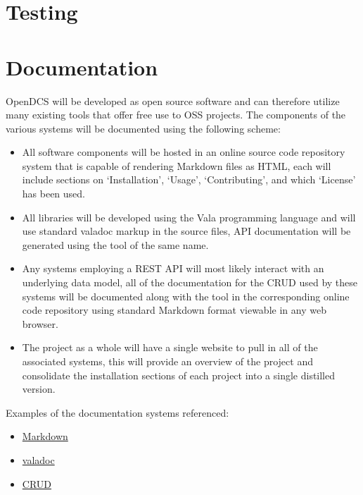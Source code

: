 \documentclass[11pt]{article}
\begin{document}
  \section{Testing}\label{sec:test}

  \section{Documentation}\label{sec:doc}

    OpenDCS will be developed as open source software and can therefore
    utilize many existing tools that offer free use to OSS projects. The
    components of the various systems will be documented using the following
    scheme:

    \begin{itemize}
      \item All software components will be hosted in an online source code
            repository system that is capable of rendering Markdown files as
            HTML, each will include sections on `Installation', `Usage',
            `Contributing', and which `License' has been used.
      \item All libraries will be developed using the Vala programming language
            and will use standard valadoc markup in the source files, API
            documentation will be generated using the tool of the same name.
      \item Any systems employing a REST API will most likely interact with an
            underlying data model, all of the documentation for the CRUD used
            by these systems will be documented along with the tool in the
            corresponding online code repository using standard Markdown format
            viewable in any web browser.
      \item The project as a whole will have a single website to pull in all of
            the associated systems, this will provide an overview of the
            project and consolidate the installation sections of each project
            into a single distilled version.
    \end{itemize}

    Examples of the documentation systems referenced:

    \begin{itemize}
      \item \href{https://help.github.com/articles/basic-writing-and-formatting-syntax/}{Markdown}
      \item \href{http://valadoc.org}{valadoc}
      \item \href{http://theforeman.org/api/1.11/index.html}{CRUD}
    \end{itemize}
\end{document}
